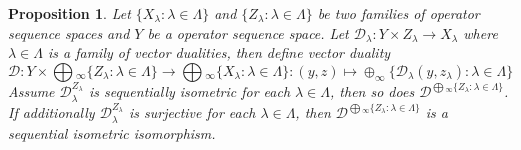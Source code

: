 \documentclass[12pt]{article}
\newtheorem{proposition}[theorem]{Proposition}
\begin{document}
\begin{proposition}\label{PrVectDualProdComp} Let 
$ \{X_\lambda:\lambda\in\Lambda \}$ and 
$ \{Z_\lambda:\lambda\in\Lambda \}$ be two families of operator sequence spaces 
and $Y$ be a operator sequence space. Let 
$\mathcal{D}_\lambda: Y\times Z_\lambda\to X_\lambda$ where 
$\lambda\in\Lambda$ is a family of vector dualities, then define vector duality
$$
\mathcal{D}
:Y\times\bigoplus{}_\infty \{Z_\lambda:\lambda\in\Lambda \}
    \to
\bigoplus{}_\infty \{X_\lambda:\lambda\in\Lambda \}
:(y,z)\mapsto
\oplus_\infty \{\mathcal{D}_\lambda(y,z_\lambda):\lambda\in\Lambda \}
$$
Assume $\mathcal{D}_\lambda^{Z_\lambda}$ is sequentially isometric for each 
$\lambda\in\Lambda$, then so does 
$\mathcal{D}^{\bigoplus{}_\infty \{Z_\lambda:\lambda\in\Lambda \}}$. 
If additionally $\mathcal{D}_\lambda^{Z_\lambda}$ is surjective for each 
$\lambda\in\Lambda$, then 
$\mathcal{D}^{\bigoplus{}_\infty \{Z_\lambda:\lambda\in\Lambda \}}$ is a 
sequential isometric isomorphism.
\end{proposition}
\end{document}
